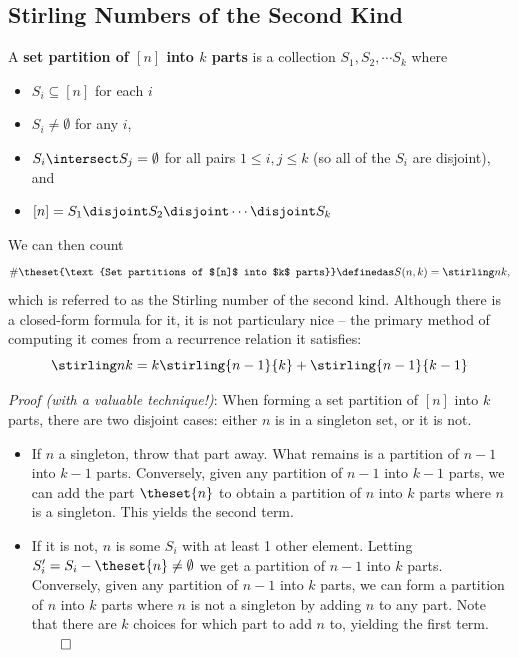 \hypertarget{stirling-numbers-of-the-second-kind}{%
\subsection{Stirling Numbers of the Second
Kind}\label{stirling-numbers-of-the-second-kind}}

A \textbf{set partition of \([n]\) into \(k\) parts} is a collection
\(S_1, S_2, \cdots S_k\) where

\begin{itemize}
\tightlist
\item
  \(S_i \subseteq [n]\) for each \(i\)
\item
  \(S_i \neq \emptyset\) for any \(i\),
\item
  \(S_i \intersect S_j = \emptyset\) for all pairs \(1 \leq i,j \leq k\)
  (so all of the \(S_i\) are disjoint), and
\item
  \([n] = S_1 \disjoint S_2 \disjoint \cdots \disjoint S_k\)
\end{itemize}

We can then count \[
\#\theset{\text{Set partitions of $[n]$ into $k$ parts}} \definedas S(n, k) = \stirling n k,
\] which is referred to as the Stirling number of the second kind.
Although there is a closed-form formula for it, it is not particulary
nice -- the primary method of computing it comes from a recurrence
relation it satisfies: \[
\stirling n k = k\stirling {n-1} {k} + \stirling{n-1}{k-1}
\]

\emph{Proof (with a valuable technique!)}: When forming a set partition
of \([n]\) into \(k\) parts, there are two disjoint cases: either \(n\)
is in a singleton set, or it is not.

\begin{itemize}
\tightlist
\item
  If \(n\) a singleton, throw that part away. What remains is a
  partition of \(n-1\) into \(k-1\) parts. Conversely, given any
  partition of \(n-1\) into \(k-1\) parts, we can add the part
  \(\theset{n}\) to obtain a partition of \(n\) into \(k\) parts where
  \(n\) is a singleton. This yields the second term.
\item
  If it is not, \(n\) is some \(S_i\) with at least 1 other element.
  Letting \(S'_i = S_i - \theset{n} \neq \emptyset\) we get a partition
  of \(n-1\) into \(k\) parts. Conversely, given any partition of
  \(n-1\) into \(k\) parts, we can form a partition of \(n\) into \(k\)
  parts where \(n\) is not a singleton by adding \(n\) to any part. Note
  that there are \(k\) choices for which part to add \(n\) to, yielding
  the first term. \(\qed\)
\end{itemize}

